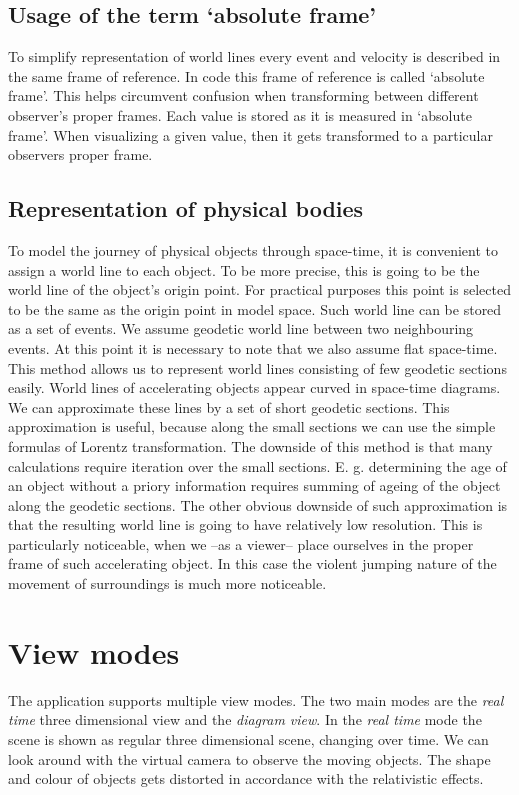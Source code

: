 \documentclass{egpubl}
\begin{document}
\subsection{Usage of the term `absolute frame'}
To simplify representation of world lines every event and velocity is described in the same frame of reference. In code this frame of reference is called `absolute frame'. This helps circumvent confusion when transforming between different observer's proper frames. Each value is stored as it is measured in `absolute frame'. When visualizing a given value, then it gets transformed to a particular observers proper frame.

\subsection{Representation of physical bodies}
To model the journey of physical objects through space-time, it is convenient to assign a world line to each object. To be more precise, this is going to be the world line of the object's origin point. For practical purposes this point is selected to be the same as the origin point in model space. Such world line can be stored as a set of events. We assume geodetic world line between two neighbouring events. At this point it is necessary to note that we also assume flat space-time. This method allows us to represent world lines consisting of few geodetic sections easily. World lines of accelerating objects appear curved in space-time diagrams. We can approximate these lines by a set of short geodetic sections. This approximation is useful, because along the small sections we can use the simple formulas of Lorentz transformation. The downside of this method is that many calculations require iteration over the small sections. E. g. determining the age of an object without a priory information requires summing of ageing of the object along the geodetic sections. The other obvious downside of such approximation is that the resulting world line is going to have relatively low resolution. This is particularly noticeable, when we --as a viewer-- place ourselves in the proper frame of such accelerating object. In this case the violent jumping nature of the movement of surroundings is much more noticeable.

\section{View modes}
The application supports multiple view modes. The two main modes are the \emph{real time} three dimensional view and the \emph{diagram view}. In the \emph{real time} mode the scene is shown as regular three dimensional scene, changing over time. We can look around with the virtual camera to observe the moving objects. The shape and colour of objects gets distorted in accordance with the relativistic effects.
\end{document}
